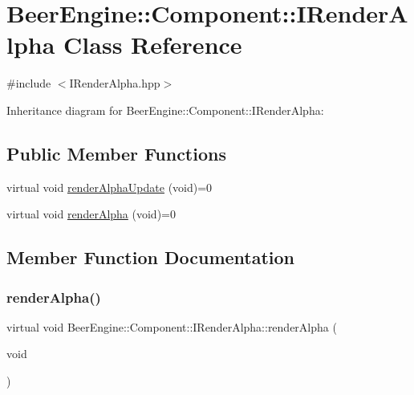 \hypertarget{class_beer_engine_1_1_component_1_1_i_render_alpha}{}\section{Beer\+Engine\+:\+:Component\+:\+:I\+Render\+Alpha Class Reference}
\label{class_beer_engine_1_1_component_1_1_i_render_alpha}


{\ttfamily \#include $<$I\+Render\+Alpha.\+hpp$>$}



Inheritance diagram for Beer\+Engine\+:\+:Component\+:\+:I\+Render\+Alpha\+:
\subsection*{Public Member Functions}
\begin{DoxyCompactItemize}
\item 
virtual void \mbox{\hyperlink{class_beer_engine_1_1_component_1_1_i_render_alpha_ad0fd47a02cc63152b25dbfdb4b2639fa}{render\+Alpha\+Update}} (void)=0
\item 
virtual void \mbox{\hyperlink{class_beer_engine_1_1_component_1_1_i_render_alpha_a3797df36149a8a8416ef24406923f068}{render\+Alpha}} (void)=0
\end{DoxyCompactItemize}


\subsection{Member Function Documentation}
\mbox{\label{class_beer_engine_1_1_component_1_1_i_render_alpha_a3797df36149a8a8416ef24406923f068}} 
\subsubsection{\texorpdfstring{render\+Alpha()}{renderAlpha()}}
{\footnotesize\ttfamily virtual void Beer\+Engine\+::\+Component\+::\+I\+Render\+Alpha\+::render\+Alpha (\begin{DoxyParamCaption}\item[{void}]{ }\end{DoxyParamCaption})\hspace{0.3cm}{\ttfamily [pure virtual]}}



